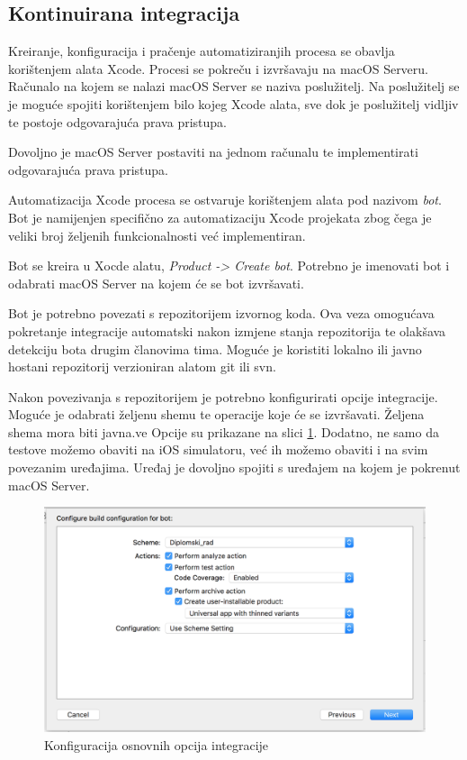 \documentclass[times, utf8, diplomski, numeric]{fer}
\begin{document}
\begin{appendices}
\section{Kontinuirana integracija}

Kreiranje, konfiguracija i pračenje automatiziranjih procesa se obavlja korištenjem alata Xcode. Procesi se pokreču i izvršavaju na macOS Serveru. Računalo na kojem se nalazi macOS Server se naziva poslužitelj. Na poslužitelj se je moguće spojiti korištenjem bilo kojeg Xcode alata, sve dok je poslužitelj vidljiv te postoje odgovarajuća prava pristupa.

Dovoljno je macOS Server postaviti na jednom računalu te implementirati odgovarajuća prava pristupa.

Automatizacija Xcode procesa se ostvaruje korištenjem alata pod nazivom \textit{bot}. Bot je namijenjen specifično za automatizaciju Xcode projekata zbog čega je veliki broj željenih funkcionalnosti već implementiran.

Bot se kreira u Xocde alatu, \textit{Product -> Create bot}. Potrebno je imenovati bot i odabrati macOS Server na kojem će se bot izvršavati.

Bot je potrebno povezati s repozitorijem izvornog koda. Ova veza omogućava pokretanje integracije automatski nakon izmjene stanja repozitorija te olakšava detekciju bota drugim članovima tima. Moguće je koristiti lokalno ili javno hostani repozitorij verzioniran alatom git ili svn.

Nakon povezivanja s repozitorijem je potrebno konfigurirati opcije integracije. Moguće je odabrati željenu shemu te operacije koje će se izvršavati. Željena shema mora biti javna.ve Opcije su prikazane na slici \ref{fig:XcodeServerOptions}. Dodatno, ne samo da testove možemo obaviti na iOS simulatoru, već ih možemo obaviti i na svim povezanim uređajima. Uređaj je dovoljno spojiti s uređajem na kojem je pokrenut macOS Server.

\begin{figure}
    \centering
    \includegraphics[scale=0.5]{XcodeServerOptions}
    \caption{Konfiguracija osnovnih opcija integracije}
    \label{fig:XcodeServerOptions}
\end{figure}


\end{appendices}
\end{document}
